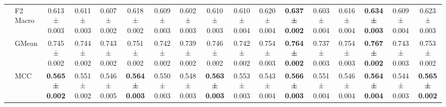 \begin{table}[H]
{\begin{tabular}{llccccccccccccccc}
 & F2 Macro & 0.613 ± 0.003 & 0.611 ± 0.003 & 0.607 ± 0.002 & 0.618 ± 0.002 & 0.609 ± 0.003 & 0.602 ± 0.003 & 0.610 ± 0.003 & 0.610 ± 0.004 & 0.620 ± 0.004 & \textbf{0.637 ± 0.002} & 0.603 ± 0.004 & 0.616 ± 0.004 & \textbf{0.634 ± 0.003} & 0.609 ± 0.004 & 0.623 ± 0.003 \\
 & GMean & 0.745 ± 0.002 & 0.744 ± 0.002 & 0.743 ± 0.002 & 0.751 ± 0.002 & 0.742 ± 0.002 & 0.739 ± 0.002 & 0.746 ± 0.002 & 0.742 ± 0.002 & 0.754 ± 0.003 & \textbf{0.764 ± 0.002} & 0.737 ± 0.003 & 0.754 ± 0.003 & \textbf{0.767 ± 0.002} & 0.743 ± 0.003 & 0.753 ± 0.002 \\
 & MCC & \textbf{0.565 ± 0.002} & 0.551 ± 0.002 & 0.546 ± 0.005 & \textbf{0.564 ± 0.003} & 0.550 ± 0.003 & 0.548 ± 0.003 & \textbf{0.563 ± 0.003} & 0.553 ± 0.003 & 0.543 ± 0.004 & \textbf{0.566 ± 0.003} & 0.551 ± 0.004 & 0.546 ± 0.004 & \textbf{0.564 ± 0.004} & 0.544 ± 0.003 & \textbf{0.565 ± 0.002} \\
\cline{1-17}
\bottomrule
\end{tabular}
    }
\end{table}
